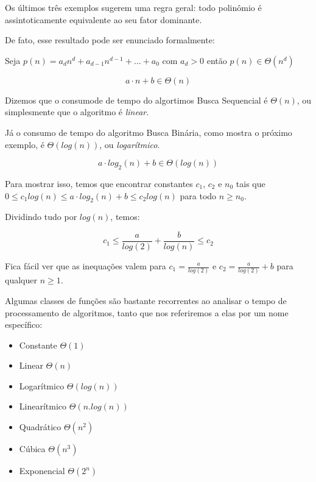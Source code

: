 Os últimos três exemplos sugerem uma regra geral: todo polinômio é assintoticamente equivalente ao seu fator dominante.

De fato, esse resultado pode ser enunciado formalmente:

\begin{theorem}
  Seja $p(n) = a_dn^d + a_{d-1}n^{d-1} + \dots + a_0$ com $a_d > 0$ então $p(n) \in \Theta(n^d)$
\end{theorem}

\begin{corollary}
  \begin{displaymath}
    a \cdot n + b \in \Theta(n)
  \end{displaymath}
\end{corollary}

Dizemos que o consumode de tempo do algortimos Busca Sequencial é $\Theta(n)$, ou simplesmente que o algoritmo é {\em linear}.

Já o consumo de tempo do algoritmo Busca Binária, como mostra o próximo exemplo, é $\Theta(log(n))$, ou {\em logarítmico}.

\begin{example}
  \begin{displaymath}
    a \cdot log_2(n) + b \in \Theta(log(n)) 
  \end{displaymath}

   Para mostrar isso, temos que encontrar constantes $c_1$, $c_2$ e $n_0$ tais que $0 \leq c_1 log(n) \leq a \cdot log_2(n) + b \leq c_2 log(n)$ para todo $n \geq n_0$.

   Dividindo tudo por $log(n)$, temos:

   \begin{displaymath}
     c_1 \leq \frac{a}{log(2)} + \frac{b}{log(n)} \leq c_2 
   \end{displaymath}

   Fica fácil ver que as inequações valem para $c_1 = \frac{a}{log(2)}$ e $c_2 = \frac{a}{log(2)} + b$ para qualquer $n \geq 1$.   
\end{example}

Algumas classes de funções são bastante recorrentes ao analisar o tempo de processamento de algoritmos, tanto que nos referiremos a elas por um nome específico:

\begin{itemize}
\item Constante $\Theta(1)$
\item Linear $\Theta(n)$
\item Logarítmico $\Theta(log(n))$
\item Linearítmico $\Theta(n.log(n))$
\item Quadrático $\Theta(n^2)$
\item Cúbica $\Theta(n^3)$
\item Exponencial $\Theta(2^n)$
\end{itemize}

